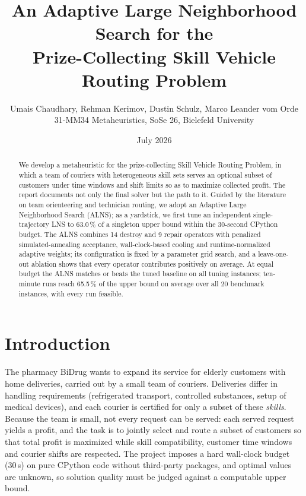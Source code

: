 \documentclass[10pt, a4paper]{article}
\title{An Adaptive Large Neighborhood Search for the\\
       Prize-Collecting Skill Vehicle Routing Problem}
\author{Umais Chaudhary, Rehman Kerimov, Dustin Schulz, Marco Leander vom Orde \\
        \small 31-MM34 Metaheuristics, SoSe 26, Bielefeld University}
\date{July 2026}
\begin{document}
\maketitle

\begin{abstract}
We develop a metaheuristic for the prize-collecting Skill Vehicle Routing
Problem, in which a team of couriers with heterogeneous skill sets serves an
optional subset of customers under time windows and shift limits so as to
maximize collected profit. The report documents not only the final solver but
the path to it. Guided by the literature on team orienteering and technician
routing, we adopt an Adaptive Large Neighborhood Search (ALNS); as a
yardstick, we first tune an independent single-trajectory LNS to 63.0\,\% of
a singleton upper bound within the 30-second CPython budget. The ALNS
combines 14 destroy and 9 repair operators with penalized simulated-annealing
acceptance, wall-clock-based cooling and runtime-normalized adaptive weights;
its configuration is fixed by a parameter grid search, and a leave-one-out
ablation shows that every operator contributes positively on average. At
equal budget the ALNS matches or beats the tuned baseline on all tuning
instances; ten-minute runs reach 65.5\,\% of the upper bound on average over
all 20 benchmark instances, with every run feasible.
\end{abstract}

\section{Introduction}\label{sec:intro}

The pharmacy BiDrug wants to expand its service for elderly customers with
home deliveries, carried out by a small team of couriers. Deliveries differ
in handling requirements (refrigerated transport, controlled substances,
setup of medical devices), and each courier is certified for only a subset of
these \emph{skills}. Because the team is small, not every request can be
served: each served request yields a profit, and the task is to jointly
select and route a subset of customers so that total profit is maximized
while skill compatibility, customer time windows and courier shifts are
respected. The project imposes a hard wall-clock budget (30\,s) on pure
CPython code without third-party packages, and optimal values are unknown, so
solution quality must be judged against a computable upper bound.
\end{document}
